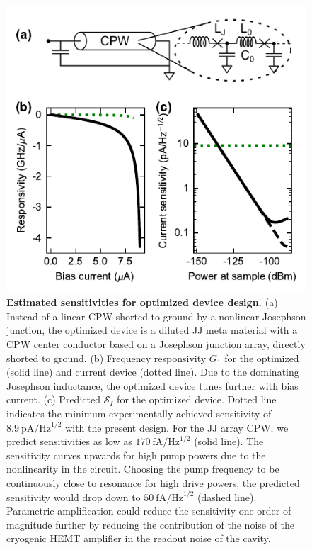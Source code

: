 \begin{figure}
	\centering
	\includegraphics[]{chapter-currentdetection/figures/Figure5}
	\caption{
		\textbf{Estimated sensitivities for optimized device design.}
		(a) Instead of a linear CPW shorted to ground by a nonlinear Josephson junction, the optimized device is a diluted JJ meta material with a CPW center conductor based on a Josephson junction array, directly shorted to ground.
		(b) Frequency responsivity $G_1$ for the optimized (solid line) and current device (dotted line).
		Due to the dominating Josephson inductance, the optimized device tunes further with bias current.
		(c) Predicted $\mathcal{S}_I$ for the optimized device.
		Dotted line indicates the minimum experimentally achieved sensitivity of $\SI{8.9}{\pico\ampere\per\hertz\tothe{1/2}}$ with the present design.
		For the JJ array CPW, we predict sensitivities as low as $\SI{170}{\femto\ampere\per\hertz\tothe{1/2}}$ (solid line).
		The sensitivity curves upwards for high pump powers due to the nonlinearity in the circuit.
		Choosing the pump frequency to be continuously close to resonance for high drive powers, the predicted sensitivity would drop down to $\SI{50}{\femto\ampere\per\hertz\tothe{1/2}}$ (dashed line).
		Parametric amplification could reduce the sensitivity one order of magnitude further by reducing the contribution of the noise of the cryogenic HEMT amplifier in the readout noise of the cavity.
		\label{fig:figure5}
	}
\end{figure}

